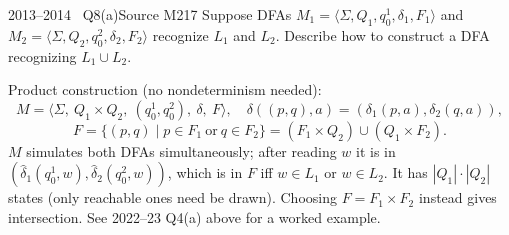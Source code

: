 \documentclass[11pt,a4paper]{article}
\begin{document}
\begin{question}{2013--2014 \textbullet\ Q8(a)}{Source M21}{7}
Suppose DFAs $M_1=\langle\Sigma,Q_1,q_0^1,\delta_1,F_1\rangle$ and $M_2=\langle\Sigma,Q_2,q_0^2,\delta_2,F_2\rangle$ recognize $L_1$ and $L_2$. Describe how to construct a DFA recognizing $L_1\cup L_2$.
\end{question}
\begin{solution}
Product construction (no nondeterminism needed):
\[ M=\langle\Sigma,\ Q_1\times Q_2,\ (q_0^1,q_0^2),\ \delta,\ F\rangle,\quad \delta((p,q),a)=(\delta_1(p,a),\delta_2(q,a)),\]
\[F=\{(p,q)\mid p\in F_1\ \text{or}\ q\in F_2\}=(F_1\times Q_2)\cup(Q_1\times F_2).\]
$M$ simulates both DFAs simultaneously; after reading $w$ it is in $(\hat\delta_1(q_0^1,w),\hat\delta_2(q_0^2,w))$, which is in $F$ iff $w\in L_1$ or $w\in L_2$. It has $|Q_1|\cdot|Q_2|$ states (only reachable ones need be drawn). Choosing $F=F_1\times F_2$ instead gives intersection. See 2022--23 Q4(a) above for a worked example.
\end{solution}
\end{document}
